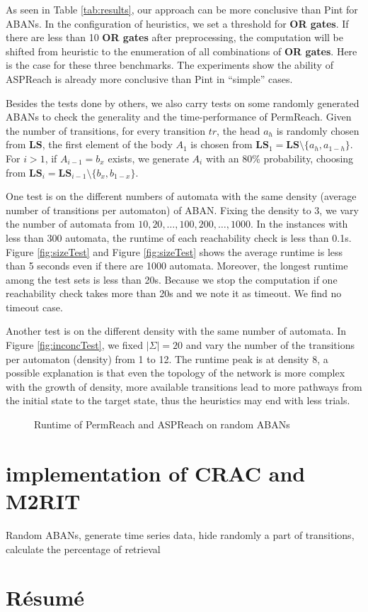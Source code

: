 As seen in Table \ref{tab:results}, our approach can be more conclusive than Pint for ABANs.
In the configuration of heuristics, we set a threshold for \textbf{OR gates}.
If there are less than 10 \textbf{OR gates} after preprocessing, the computation will be shifted from heuristic to the enumeration of all combinations of \textbf{OR gates}.
Here is the case for these three benchmarks. The experiments show the ability of ASPReach is already more conclusive than Pint in ``simple'' cases.

Besides the tests done by others, we also carry tests on some randomly generated ABANs to check the generality and the time-performance of PermReach. 
Given the number of transitions, for every transition $tr$, the head $a_h$ is randomly chosen from $\mathbf{LS}$, the first element of the body $A_1$ is chosen from $\mathbf{LS}_1=\mathbf{LS}\setminus \{a_h,a_{1-h}\}$.
For $i>1$, if $A_{i-1}=b_x$ exists, we generate $A_i$ with an 80\% probability, choosing from $\mathbf{LS}_i=\mathbf{LS}_{i-1}\setminus \{b_x,b_{1-x}\}$. 
 
One test is on the different numbers of automata with the same density (average number of transitions per automaton) of ABAN. Fixing the density to 3, we vary the number of automata from $10,20,\ldots,100,200,\ldots,1000$.
In the instances with less than 300 automata, the runtime of each reachability check is less than 0.1s.
Figure \ref{fig:sizeTest} and Figure \ref{fig:sizeTest} shows the average runtime is less than 5 seconds even if there are 1000 automata. 
Moreover, the longest runtime among the test sets is less than 20s. 
Because we stop the computation if one reachability check takes more than 20s and we note it as timeout.
We find no timeout case.

Another test is on the different density with the same number of automata. 
In Figure \ref{fig:inconcTest}, we fixed $|\Sigma|=20$ and vary the number of the transitions per automaton (density) from 1 to 12.
The runtime peak is at density 8, a possible explanation is that even the topology of the network is more complex with the growth of density, more available transitions lead to more pathways from the initial state to the target state, thus the heuristics may end with less trials.
\begin{figure}[ht]
    \caption[Runtime tests of reachability analyzers]{Runtime of PermReach and ASPReach on random ABANs}
\end{figure}

\section{implementation of CRAC and M2RIT}

Random ABANs, generate time series data, hide randomly a part of transitions, calculate the percentage of retrieval

\section{R\'esum\'e}